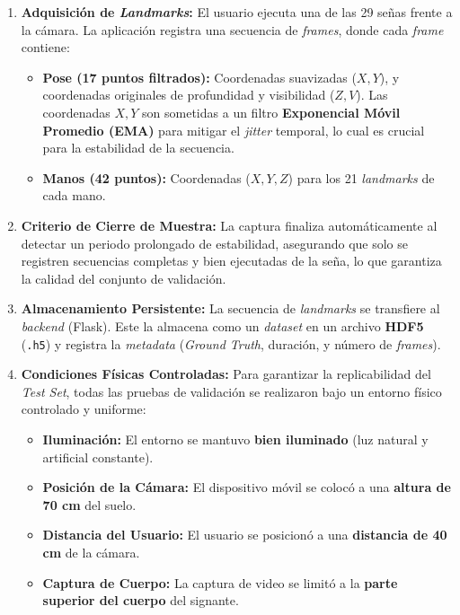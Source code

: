 \begin{enumerate}
    \item \textbf{Adquisición de \textit{Landmarks}:} El usuario ejecuta una de las 29 señas frente a la cámara. La aplicación registra una secuencia de \textit{frames}, donde cada \textit{frame} contiene:
    \begin{itemize}
        \item \textbf{Pose (17 puntos filtrados):} Coordenadas suavizadas ($X, Y$), y coordenadas originales de profundidad y visibilidad ($Z, V$). Las coordenadas $X, Y$ son sometidas a un filtro \textbf{Exponencial Móvil Promedio (EMA)} para mitigar el \textit{jitter} temporal, lo cual es crucial para la estabilidad de la secuencia.
        \item \textbf{Manos (42 puntos):} Coordenadas ($X, Y, Z$) para los 21 \textit{landmarks} de cada mano.
    \end{itemize}
    \item \textbf{Criterio de Cierre de Muestra:} La captura finaliza automáticamente al detectar un periodo prolongado de estabilidad, asegurando que solo se registren secuencias completas y bien ejecutadas de la seña, lo que garantiza la calidad del conjunto de validación.
    \item \textbf{Almacenamiento Persistente:} La secuencia de \textit{landmarks} se transfiere al \textit{backend} (Flask). Este la almacena como un \textit{dataset} en un archivo \textbf{HDF5} (\texttt{.h5}) y registra la \textit{metadata} (\textit{Ground Truth}, duración, y número de \textit{frames}).
    \item \textbf{Condiciones Físicas Controladas:} Para garantizar la replicabilidad del \textit{Test Set}, todas las pruebas de validación se realizaron bajo un entorno físico controlado y uniforme:
    \begin{itemize}
        \item \textbf{Iluminación:} El entorno se mantuvo \textbf{bien iluminado} (luz natural y artificial constante).
        \item \textbf{Posición de la Cámara:} El dispositivo móvil se colocó a una \textbf{altura de 70 cm} del suelo.
        \item \textbf{Distancia del Usuario:} El usuario se posicionó a una \textbf{distancia de 40 cm} de la cámara.
        \item \textbf{Captura de Cuerpo:} La captura de video se limitó a la \textbf{parte superior del cuerpo} del signante.
    \end{itemize}
\end{enumerate}

